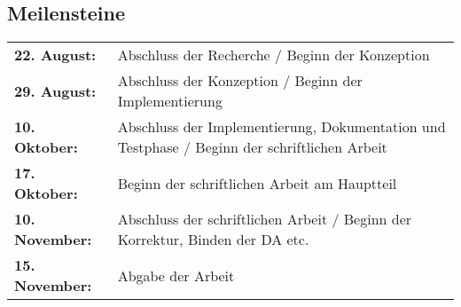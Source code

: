   \subsection{Meilensteine}
  \label{ssec:meilensteine}
    \begin{table}[H]
      \begin{tabularx}{\textwidth}{lX}
        \textbf{22. August:}
          & Abschluss der Recherche / Beginn der Konzeption\\
        \textbf{29. August:}
          & Abschluss der Konzeption / Beginn der Implementierung\\
        \textbf{10. Oktober:}
          & Abschluss der Implementierung, Dokumentation und Testphase / Beginn der schriftlichen Arbeit\\
        \textbf{17. Oktober:}
          & Beginn der schriftlichen Arbeit am Hauptteil\\
        \textbf{10. November:}
          & Abschluss der schriftlichen Arbeit / Beginn der Korrektur, Binden der DA etc.\\
        \textbf{15. November:}
          & Abgabe der Arbeit\\
      \end{tabularx}
    \end{table}


